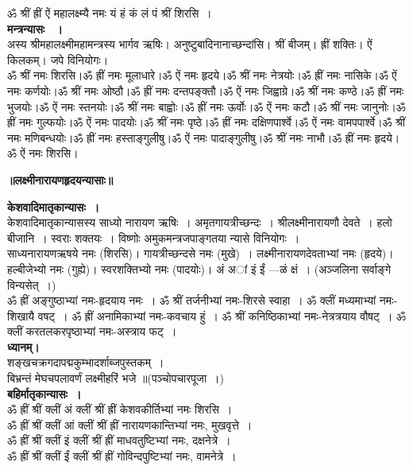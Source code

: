 \documentclass[twoside,top=1.7cm, bottom=1.7cm, outer=1cm,landscape, inner=1.5cm,a5paper,]{book}
\begin{document}
ॐ श्रीं ह्रीं ऐं महालक्ष्म्यै नमः यं हं कं लं  पं श्रीं शिरसि~।\\[10pt]
{\bfseries मन्त्रन्यासः ~।}\\
अस्य श्रीमहालक्ष्मीमहामन्त्रस्य भार्गव ऋषिः। अनुष्टुबादिनानाच्छन्दांसि। श्रीं बीजम्। ह्रीं शक्तिः। ऐं किलकम्। जपे विनियोगः।\\
ॐ श्रीं नमः शिरसि।ॐ ह्रीं नमः मूलाधारे।ॐ ऐं नमः हृदये।ॐ श्रीं नमः नेत्रयोः।ॐ ह्रीं नमः नासिके।ॐ ऐं नमः कर्णयोः।ॐ श्रीं नमः ओष्ठौ।ॐ ह्रीं नमः दन्तपङ्क्तौ।ॐ ऐं नमः जिह्वाग्रे।ॐ श्रीं नमः कण्ठे।ॐ ह्रीं नमः भुजयोः।ॐ ऐं नमः स्तनयोः।ॐ श्रीं नमः बाह्वोः।ॐ ह्रीं नमः ऊर्वोः।ॐ ऐं नमः कटौ।ॐ श्रीं नमः जानुनोः।ॐ ह्रीं नमः गुल्फयोः।ॐ ऐं नमः पादयोः।ॐ श्रीं नमः पृष्ठे।ॐ ह्रीं नमः दक्षिणपार्श्वे।ॐ ऐं नमः वामपपार्श्वे।ॐ श्रीं नमः मणिबन्धयोः।ॐ ह्रीं नमः हस्ताङ्गुलीषु।ॐ ऐं नमः पादाङ्गुलीषु।ॐ श्रीं नमः नाभौ।ॐ ह्रीं नमः हृदये।ॐ ऐं नमः शिरसि।
\newpage
\begin{center}{\bfseries\LARGE ॥लक्ष्मीनारायणहृदयन्यासाः॥}\end{center}
{\bfseries केशवादिमातृकान्यासः~।}\\
केशवादिमातृकान्यासस्य साध्यो नारायण ऋषिः~। अमृतगायत्रीच्छन्दः~। श्रीलक्ष्मीनारायणौ देवते~। हलो बीजानि~। स्वराः शक्तयः~। विष्णोः अमुकमन्त्रजपाङ्गतया न्यासे विनियोगः~।\\
साध्यनारायणऋषये नमः (शिरसि)। गायत्रीच्छन्दसे नमः (मुखे)~। लक्ष्मीनारायणदेवताभ्यां नमः (हृदये)। हल्बीजेभ्यो नमः (गुह्ये)। स्वरशक्तिभ्यो नमः (पादयोः)।
अं अां  इं ईं ---ळं क्षं~। (अञ्जलिना सर्वाङ्गे विन्यसेत्~।)\\
ॐ ह्रीं अङ्गुष्ठाभ्यां नमः-हृदयाय नमः~। 
ॐ श्रीं तर्जनीभ्यां नमः-शिरसे स्वाहा~।
ॐ क्लीं मध्यमाभ्यां नमः-शिखायै वषट्~।
ॐ ह्रीं  अनामिकाभ्यां नमः-कवचाय हुं~।
ॐ श्रीं कनिष्ठिकाभ्यां नमः-नेत्रत्रयाय वौषट्~।
ॐ क्लीं करतलकरपृष्ठाभ्यां नमः-अस्त्राय फट्~।\\[10pt]
{\bfseries ध्यानम्।}\\
शङ्खचक्रगदापद्मकुम्भादर्शाब्जपुस्तकम्~।\\
बिभ्रन्तं मेघचपलावर्णं लक्ष्मीहरिं भजे ॥(पञ्चोपचारपूजा~।)\\[10pt]
{\bfseries बहिर्मातृकान्यासः~।}\\
ॐ ह्रीं श्रीं क्लीं अं क्लीं श्रीं ह्रीं केशवकीर्तिभ्यां नमः शिरसि~।\\
ॐ ह्रीं श्रीं क्लीं आं क्लीं श्रीं ह्रीं नारायणकान्तिभ्यां नमः, मुखवृत्ते~।\\
ॐ ह्रीं श्रीं क्लीं इं क्लीं श्रीं ह्रीं माधवतुष्टिभ्यां नमः, दक्षनेत्रे~।\\
ॐ ह्रीं श्रीं क्लीं ईं क्लीं श्रीं ह्रीं गोविन्दपुष्टिभ्यां नमः, वामनेत्रे~।\\
\end{document}
